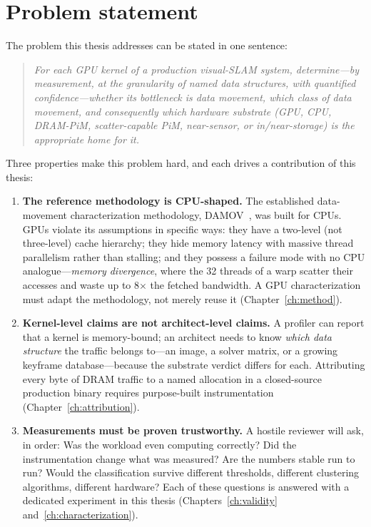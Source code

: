 \section{Problem statement}

The problem this thesis addresses can be stated in one sentence:

\begin{quote}
\emph{For each GPU kernel of a production visual-SLAM system, determine---by
measurement, at the granularity of named data structures, with quantified
confidence---whether its bottleneck is data movement, which class of data
movement, and consequently which hardware substrate (GPU, CPU, DRAM-PiM,
scatter-capable PiM, near-sensor, or in/near-storage) is the appropriate home
for it.}
\end{quote}

Three properties make this problem hard, and each drives a contribution of
this thesis:

\begin{enumerate}
\item \textbf{The reference methodology is CPU-shaped.} The established
data-movement characterization methodology, DAMOV~\cite{oliveira2021damov},
was built for CPUs. GPUs violate its assumptions in specific ways: they have
a two-level (not three-level) cache hierarchy; they hide memory latency with
massive thread parallelism rather than stalling; and they possess a failure
mode with no CPU analogue---\emph{memory divergence}, where the 32 threads of
a warp scatter their accesses and waste up to 8$\times$ the fetched
bandwidth. A GPU characterization must adapt the methodology, not merely
reuse it (Chapter~\ref{ch:method}).
\item \textbf{Kernel-level claims are not architect-level claims.} A profiler
can report that a kernel is memory-bound; an architect needs to know
\emph{which data structure} the traffic belongs to---an image, a solver
matrix, or a growing keyframe database---because the substrate verdict
differs for each. Attributing every byte of DRAM traffic to a named
allocation in a closed-source production binary requires purpose-built
instrumentation (Chapter~\ref{ch:attribution}).
\item \textbf{Measurements must be proven trustworthy.} A hostile reviewer
will ask, in order: Was the workload even computing correctly? Did the
instrumentation change what was measured? Are the numbers stable run to run?
Would the classification survive different thresholds, different clustering
algorithms, different hardware? Each of these questions is answered with a
dedicated experiment in this thesis (Chapters~\ref{ch:validity}
and~\ref{ch:characterization}).
\end{enumerate}

